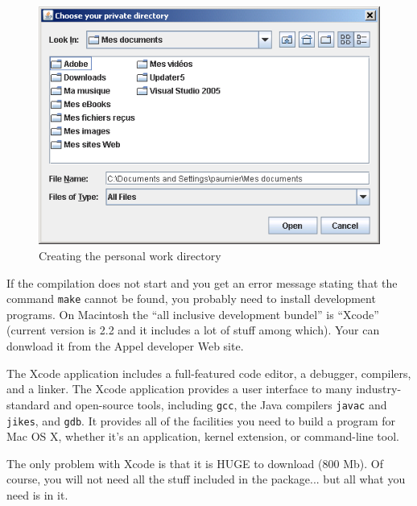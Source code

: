 \begin{figure}[h]
\begin{center}
\includegraphics[width=13cm]{resources/img/fig1-3.png}
\caption{Creating the personal work
directory\label{fig-creation-personal-directory}}
\end{center}
\end{figure}

\bigskip
\noindent If the compilation does not start and you get an error message
stating that the command \verb+make+ cannot be found, you probably need to
install development programs. On Macintosh the ``all inclusive development
bundel'' is ``Xcode'' (current version is 2.2 and it includes a lot
of stuff among which). Your can donwload it from the Appel developer Web site.

\bigskip
\noindent The Xcode application includes a full-featured code editor, a debugger, 
compilers, and a linker. The Xcode application provides a user interface to many 
industry-standard and open-source tools, including \verb+gcc+, the Java compilers
\verb+javac+ and \verb+jikes+, and \verb+gdb+. It provides all of the facilities you
need to build a program for Mac OS X, whether it's an application, kernel
extension, or command-line tool.

\bigskip
\noindent The only problem with Xcode is that it is HUGE to download (800 Mb).
Of course, you will not need all the stuff included in the package... but all
what you need is in it.

